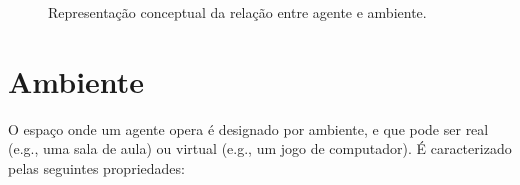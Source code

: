 \begin{figure}[H]
    \begin{center}
    \end{center}
    \caption{Representação conceptual da
    relação entre agente e ambiente.}\label{fig:modelo-agente-ambiente}
\end{figure}


\section{Ambiente}\label{sec:ambiente}

O espaço onde um agente opera é designado por ambiente, e que pode ser real (e.g., uma sala de aula) ou virtual (e.g., um jogo de computador). É caracterizado pelas seguintes propriedades:

